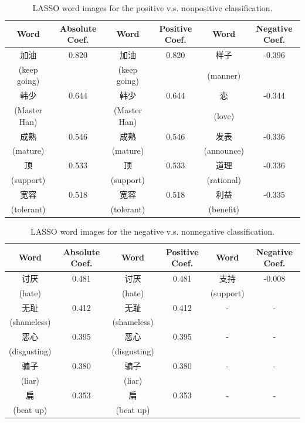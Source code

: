 \documentclass[11pt]{article}
\newcommand{\1}[1]{{\mathbf 1}\left\{#1\right\}}        %
\begin{document}
\begin{table}[!h]
\caption{LASSO word images for the positive v.s. nonpositive classification.}
\begin{center}
\begin{tabular}{|c|c||c|c||c|c|}
\hline
Word & Absolute Coef. & Word & Positive Coef. & Word & Negative Coef.\\ \hline \hline
加油 & 0.820 & 加油 & 0.820 & 样子 & -0.396\\
(keep going) & & (keep going) & & (manner) & \\\hline
韩少 & 0.644 & 韩少 & 0.644 & 恋 & -0.344\\
(Master Han) & & (Master Han) & & (love) & \\\hline
成熟 & 0.546 & 成熟 & 0.546 & 发表 & -0.336\\
(mature) & & (mature) & & (announce) & \\\hline
顶 & 0.533 & 顶 & 0.533 & 道理 & -0.336\\
(support) & & (support) & & (rational) & \\\hline
宽容 & 0.518 & 宽容 & 0.518 & 利益 & -0.335\\
(tolerant) & & (tolerant) & & (benefit) & \\\hline
\end{tabular}
\label{tb:lassopos}
\end{center}
\end{table}



\begin{table}[!h]
\caption{LASSO word images for the negative v.s. nonnegative classification.}
\begin{center}
\begin{tabular}{|c|c||c|c||c|c|}
\hline
Word & Absolute Coef. & Word & Positive Coef. & Word & Negative Coef.\\ \hline \hline
讨厌 & 0.481 & 讨厌 & 0.481 & 支持 & -0.008\\
(hate) & & (hate) & & (support) & \\\hline
无耻 & 0.412 & 无耻 & 0.412 & - & -\\
(shameless) & & (shameless) & &  & \\\hline
恶心 & 0.395 & 恶心 & 0.395 & - & -\\
(disgusting) & & (disgusting) & &  & \\\hline
骗子 & 0.380 & 骗子 & 0.380 & - & -\\
(liar) & & (liar) & &  & \\\hline
扁 & 0.353 & 扁 & 0.353 & - & -\\
(beat up) & & (beat up) & &  & \\\hline
\end{tabular}
\label{tb:lassoneg}
\end{center}
\end{table}
\end{document}
